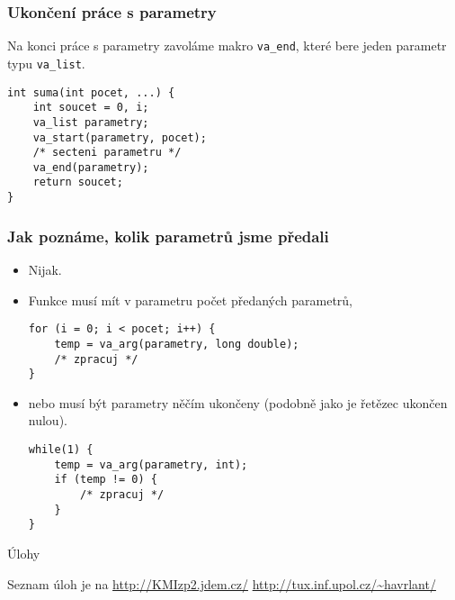 \documentclass{beamer}
\begin{document}
\begin{frame}[t,fragile]\frametitle{Ukončení práce s parametry} 
Na konci práce s parametry zavoláme makro \texttt{va\_end}, které bere jeden parametr typu \texttt{va\_list}.

\begin{verbatim} 
int suma(int pocet, ...) {
    int soucet = 0, i;
    va_list parametry;
    va_start(parametry, pocet);
    /* secteni parametru */
    va_end(parametry);
    return soucet;
}
\end{verbatim}
\end{frame}


\begin{frame}[t,fragile]\frametitle{Jak poznáme, kolik parametrů jsme předali} 
    \begin{itemize}
        \item Nijak.
        \item Funkce musí mít v parametru počet předaných parametrů,
\begin{verbatim} 
for (i = 0; i < pocet; i++) {
    temp = va_arg(parametry, long double);
    /* zpracuj */
}
\end{verbatim}
        \item nebo musí být parametry něčím ukončeny (podobně jako je řetězec ukončen nulou).
\begin{verbatim} 
while(1) {
    temp = va_arg(parametry, int);
    if (temp != 0) {
        /* zpracuj */
    }
}
\end{verbatim}
    \end{itemize}
\end{frame}



\begin{frame}[t,fragile]{Úlohy}
\begin{center}
\vskip 1cm
{\Large Seznam úloh je na \url{http://KMIzp2.jdem.cz/}}
\vskip 2cm
\url{http://tux.inf.upol.cz/~havrlant/}
\end{center}
\end{frame}
\end{document}
